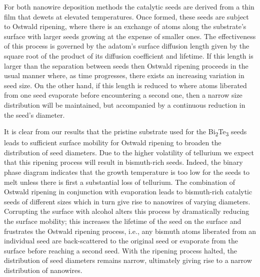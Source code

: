 For both nanowire deposition methods the catalytic
seeds are derived from a thin film that dewets at elevated
temperatures. Once formed, these seeds are subject to Ostwald
ripening, where there is an exchange of atoms along the
substrate's surface with larger seeds growing at the expense
of smaller ones\cite{Raab2000a,Li2003b}. The effectiveness of this process is
governed by the adatom's surface diffusion length given by
the square root of the product of its diffusion coefficient and
lifetime. If this length is larger than the separation between
seeds then Ostwald ripening proceeds in the usual manner
where, as time progresses, there exists an increasing variation
in seed size. On the other hand, if this length is reduced
to where atoms liberated from one seed evaporate before
encountering a second one, then a narrow size distribution will
be maintained, but accompanied by a continuous reduction in
the seed's diameter.

It is clear from our results that the pristine substrate used
for the Bi\textsubscript{2}Te\textsubscript{3} seeds leads to sufficient surface mobility for
Ostwald ripening to broaden the distribution of seed diameters.
Due to the higher volatility of tellurium we expect that this
ripening process will result in bismuth-rich seeds. Indeed, the
binary phase diagram indicates that the growth temperature is
too low for the seeds to melt unless there is first a substantial
loss of tellurium\cite{MassalskiTBMurrayJL1986}. The combination of Ostwald ripening in conjunction with evaporation leads to bismuth-rich catalytic
seeds of different sizes which in turn give rise to nanowires of
varying diameters. Corrupting the surface with alcohol alters
this process by dramatically reducing the surface mobility; this
increases the lifetime of the seed on the surface and frustrates
the Ostwald ripening process, i.e., any bismuth atoms liberated
from an individual seed are back-scattered to the original seed
or evaporate from the surface before reaching a second seed.
With the ripening process halted, the distribution of seed
diameters remains narrow, ultimately giving rise to a narrow
distribution of nanowires.

